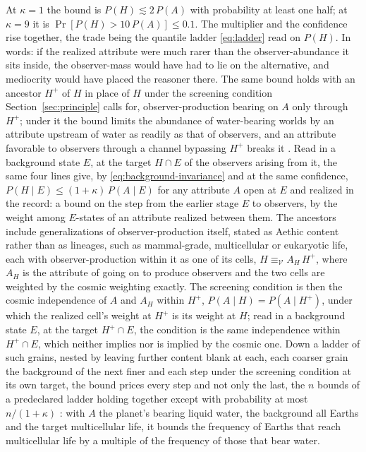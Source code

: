 \noindent At $\kappa = 1$ the bound is $P(H) \lesssim 2\,P(A)$ with probability at least one half; at $\kappa = 9$ it is $\Pr[P(H) > 10\,P(A)] \le 0.1$. The multiplier and the confidence rise together, the trade being the quantile ladder \eqref{eq:ladder} read on $P(H)$. In words: if the realized attribute were much rarer than the observer-abundance it sits inside, the observer-mass would have had to lie on the alternative, and mediocrity would have placed the reasoner there. The same bound holds with an ancestor $H^{+}$ of $H$ in place of $H$ under the screening condition Section~\ref{sec:principle} calls for, observer-production bearing on $A$ only through $H^{+}$; under it the bound limits the abundance of water-bearing worlds by an attribute upstream of water as readily as that of observers, and an attribute favorable to observers through a channel bypassing $H^{+}$ breaks it \cite{Nexus}. Read in a background state $E$, at the target $H \cap E$ of the observers arising from it, the same four lines give, by \eqref{eq:background-invariance} and at the same confidence, $P(H \mid E) \le (1+\kappa)\,P(A \mid E)$ for any attribute $A$ open at $E$ and realized in the record: a bound on the step from the earlier stage $E$ to observers, by the weight among $E$-states of an attribute realized between them. The ancestors include generalizations of observer-production itself, stated as Aethic content rather than as lineages, such as mammal-grade, multicellular or eukaryotic life, each with observer-production within it as one of its cells, $H \equiv_{\mathcal{V}} A_{H}\,H^{+}$, where $A_{H}$ is the attribute of going on to produce observers and the two cells are weighted by the cosmic weighting exactly. The screening condition is then the cosmic independence of $A$ and $A_{H}$ within $H^{+}$, $P(A \mid H) = P(A \mid H^{+})$, under which the realized cell's weight at $H^{+}$ is its weight at $H$; read in a background state $E$, at the target $H^{+} \cap E$, the condition is the same independence within $H^{+} \cap E$, which neither implies nor is implied by the cosmic one. Down a ladder of such grains, nested by leaving further content blank at each, each coarser grain the background of the next finer and each step under the screening condition at its own target, the bound prices every step and not only the last, the $n$ bounds of a predeclared ladder holding together except with probability at most $n/(1+\kappa)$ \cite{Nexus}: with $A$ the planet's bearing liquid water, the background all Earths and the target multicellular life, it bounds the frequency of Earths that reach multicellular life by a multiple of the frequency of those that bear water.

